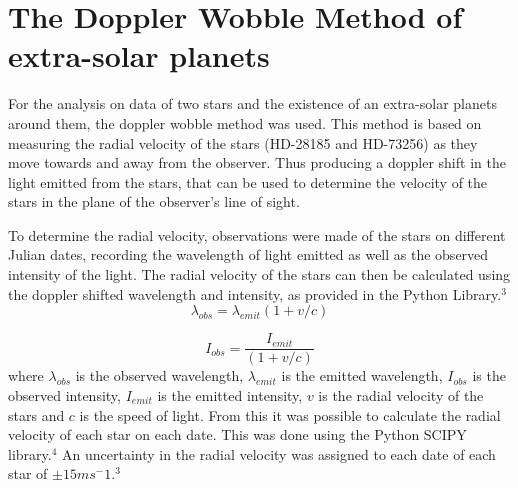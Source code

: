 \documentclass[]{article}
\begin{document}
\section*{The Doppler Wobble Method of extra-solar planets}
\par
For the analysis on data of two stars and the existence of an extra-solar planets 
around them, the doppler wobble method was used. This method is based on measuring the 
radial velocity of the stars (HD-28185 and HD-73256) as they move towards and away from 
the observer. Thus
producing a doppler shift in the light emitted from the stars, that can be used to 
determine the velocity of the stars in the plane of the observer's line of sight. 
\par
To determine the radial velocity, observations were made of the stars on different
Julian dates, recording the wavelength of light emitted as well as the observed intensity 
of the light. The radial velocity of the stars can then be calculated using the doppler
shifted wavelength and intensity, as provided in the Python Library.$^3$ 
\begin{equation}\label{eq:wavelength doppler}\lambda_{obs} = \lambda_{emit}{(1+v/c)}
\end{equation}

\begin{equation}\label{eq:intensity doppler}I_{obs} = \frac{I_{emit}}{(1+v/c)}
\end{equation}
where $\lambda_{obs}$ is the observed wavelength, $\lambda_{emit}$ is the 
emitted wavelength, $I_{obs}$ is the observed intensity, $I_{emit}$ is the emitted 
intensity, $v$ is the radial velocity of the stars and $c$ is the speed of light.
From this it was possible to calculate the radial velocity of each star on each date.
This was done using the Python SCIPY library.$^4$ An uncertainty in the radial velocity
was assigned to each date of each star of $\pm 15 ms^-1$.$^3$
\par
\end{document}
